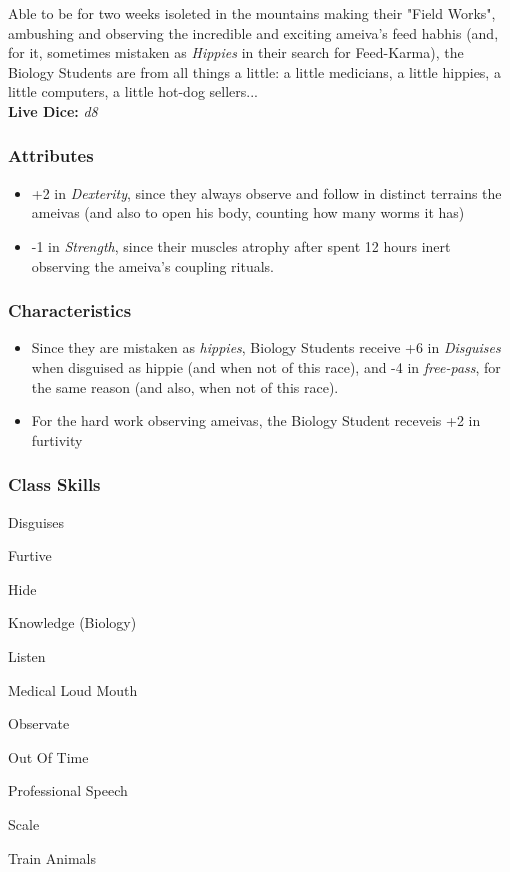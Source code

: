 \documentclass[ letterpaper,12pt]{article}
\begin{document}
Able to be for two weeks isoleted in the mountains making their "Field Works",
ambushing and observing the incredible and exciting ameiva's feed habhis (and,
for it, sometimes mistaken as {\it Hippies} in their search for Feed-Karma),
the Biology Students are from all things a little: a little medicians, a little
hippies, a little computers, a little hot-dog sellers...\\

{\bf Live Dice:} {\it d8}

\subsubsection{Attributes}
\begin{itemize}
\item{+2 in {\it Dexterity}, since they always observe and follow in distinct terrains the ameivas (and also to open his body, counting how many worms it has)}
\item{-1 in {\it Strength}, since their muscles atrophy after spent 12 hours inert observing the ameiva's coupling rituals.}
\end{itemize}

\subsubsection{Characteristics}
\begin{itemize}
\item{Since they are mistaken as {\it hippies}, Biology Students receive +6 in {\it Disguises} when disguised as hippie (and when not of this race), and -4 in {\it free-pass}, for the same reason (and also, when not of this race).}
\item{For the hard work observing ameivas, the Biology Student receveis +2 in {furtivity}}
\end{itemize}

\subsubsection{Class Skills}
\begin{itemize}
{\it 
\item{Disguises}
\item{Furtive}
\item{Hide}
\item{Knowledge (Biology)}
\item{Listen}
\item{Medical Loud Mouth}
\item{Observate}
\item{Out Of Time}
\item{Professional Speech}
\item{Scale}
\item{Train Animals}
}
\end{itemize}
\end{document}
